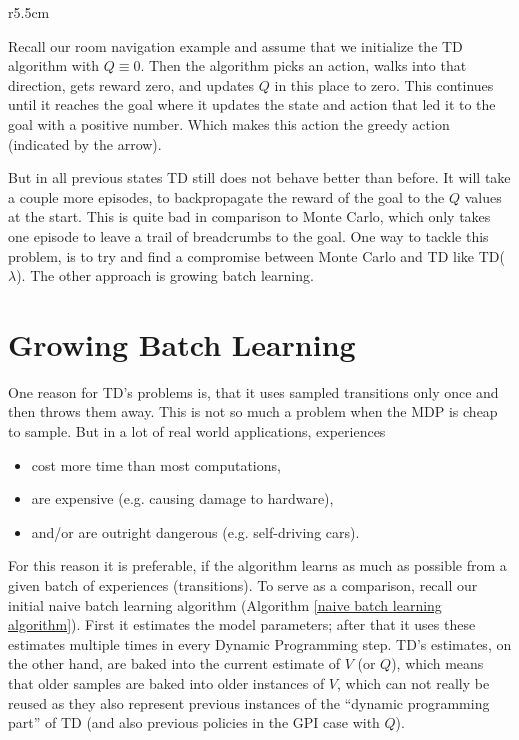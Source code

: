 \begin{wrapfigure}{r}{5.5cm}
	\begin{centering}
	\end{centering}
\end{wrapfigure}

Recall our room navigation example and assume that we initialize the TD algorithm with \({Q\equiv 0}\).
Then the algorithm picks an action, walks into that direction, gets reward zero, and updates \(Q\) in this place to zero. This continues until it reaches the goal where it updates the state and action that led it to the goal with a positive number. Which makes this action the greedy action (indicated by the arrow).
 
But in all previous states TD still does not behave better than before. It will take a couple more episodes, to backpropagate the reward of the goal to the \(Q\) values at the start. This is quite bad in comparison to Monte Carlo, which only takes one episode to leave a trail of breadcrumbs to the goal. One way to tackle this problem, is to try and find a compromise between Monte Carlo and TD like TD(\(\lambda\)). The other approach is growing batch learning. 


\section{Growing Batch Learning}\label{growing batch learning}
One reason for TD's problems is, that it uses sampled transitions only once and then throws them away. This is not so much a problem when the MDP is cheap to sample. But in a lot of real world applications, experiences 
\begin{itemize}[nosep]
	\item cost more time than most computations,
	\item are expensive (e.g. causing damage to hardware),
	\item and/or are outright dangerous (e.g. self-driving cars).
\end{itemize}
For this reason it is preferable, if the algorithm learns as much as possible from a given batch of experiences (transitions). To serve as a comparison, recall our initial naive batch learning algorithm (Algorithm \ref{naive batch learning algorithm}). First it estimates the model parameters; after that it uses these estimates multiple times in every Dynamic Programming step. TD's estimates, on the other hand, are baked into the current estimate of \(V\) (or \(Q\)), which means that older samples are baked into older instances of \(V\), which can not really be reused as they also represent previous instances of the ``dynamic programming part'' of TD (and also previous policies in the GPI case with \(Q\)).

